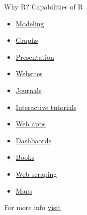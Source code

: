 \documentclass[
  8pt,
  ignorenonframetext,
  dvipsnames]{beamer}
\providecommand{\tightlist}{%
  \setlength{\itemsep}{0pt}\setlength{\parskip}{0pt}}
\let\olditem\item
\renewcommand{\item}{%
  \olditem\vspace{4pt}
}
\begin{document}
\begin{frame}{Why R? Capabilities of R}
\protect\hypertarget{why-r-capabilities-of-r}{}

\begin{itemize}
\tightlist
\item
  \href{http://r-statistics.co/Linear-Regression.html}{Modeling}
\item
  \href{https://ggplot2.tidyverse.org/}{Graphs}
\item
  \href{https://bookdown.org/yihui/rmarkdown/presentations.html}{Presentation}
\item
  \href{https://bookdown.org/yihui/rmarkdown/websites.html}{Websites}
\item
  \href{https://bookdown.org/yihui/rmarkdown/journals.html}{Journals}
\item
  \href{https://rstudio.github.io/learnr/}{Interactive tutorials}
\item
  \href{http://shiny.rstudio.com/}{Web apps}
\item
  \href{https://rmarkdown.rstudio.com/flexdashboard/}{Dashbaords}
\item
  \href{https://bookdown.org/}{Books}\\
\item
  \href{https://www.analyticsvidhya.com/blog/2017/03/beginners-guide-on-web-scraping-in-r-using-rvest-with-hands-on-knowledge/}{Web
  scraping}
\item
  \href{http://pierreroudier.github.io/teaching/20170626-Pedometrics/20170626-soil-data.html}{Maps}
\end{itemize}

For more info \href{https://bookdown.org/yihui/rmarkdown/}{visit}

\end{frame}
\end{document}
